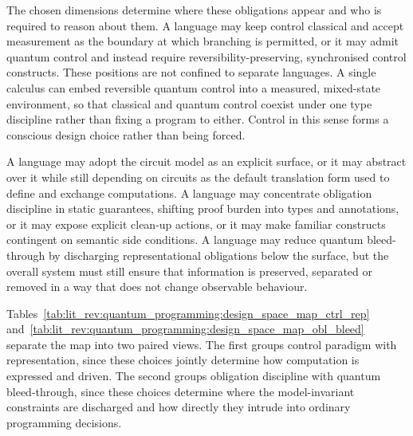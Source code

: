 The chosen dimensions determine where these obligations appear and who is required to reason about them.
A language may keep control classical and accept measurement as the boundary at which branching is permitted, or it may admit quantum control and instead require reversibility-preserving, synchronised control constructs.
These positions are not confined to separate languages.
A single calculus can embed reversible quantum control into a measured, mixed-state environment, so that classical and quantum control coexist under one type discipline rather than fixing a program to either.
Control in this sense forms a conscious design choice rather than being forced.

A language may adopt the circuit model as an explicit surface, or it may abstract over it while still depending on circuits as the default translation form used to define and exchange computations.
A language may concentrate obligation discipline in static guarantees, shifting proof burden into types and annotations, or it may expose explicit clean-up actions, or it may make familiar constructs contingent on semantic side conditions.
A language may reduce quantum bleed-through by discharging representational obligations below the surface, but the overall system must still ensure that information is preserved, separated or removed in a way that does not change observable behaviour.

Tables~\ref{tab:lit_rev:quantum_programming:design_space_map_ctrl_rep} and~\ref{tab:lit_rev:quantum_programming:design_space_map_obl_bleed} separate the map into two paired views.
The first groups control paradigm with representation, since these choices jointly determine how computation is expressed and driven.
The second groups obligation discipline with quantum bleed-through, since these choices determine where the model-invariant constraints are discharged and how directly they intrude into ordinary programming decisions.

